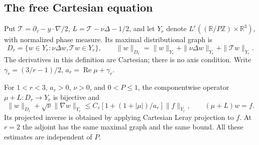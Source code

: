 \subsection{The free Cartesian equation}

Put \(\mathcal T=\partial_\tau-y\cdot\nabla/2\),
\(L=\mathcal T-\nu\Delta-1/2\), and let \(Y_r\) denote
\(L^r((\mathbb R/P\mathbb Z)\times\mathbb R^3)\), with normalized
phase measure. Its maximal distributional graph is
\[
 D_r=\{w\in Y_r:\nu\Delta w,\mathcal Tw\in Y_r\},\qquad
 \|w\|_{D_r}=\|w\|_{Y_r}+\|\nu\Delta w\|_{Y_r}
                                      +\|\mathcal Tw\|_{Y_r}.
\]
The derivatives in this definition are Cartesian; there is no axis
condition. Write \(\gamma_r=(3/r-1)/2\), \(a_r=\operatorname{Re}\mu+\gamma_r\).

\begin{lemma}\label{bg:common-body-graph}
For \(1<r<3\), \(a_r>0\), \(\nu>0\), and \(0<P\le1\),
the componentwise operator \(\mu+L:D_r\to Y_r\) is bijective and
\begin{equation}\label{bg:body-graph}
 \|w\|_{D_r}+\sqrt\nu\|\nabla w\|_{Y_r}
 \le C_r[1+(1+|\mu|)/a_r]\|f\|_{Y_r},
 \qquad (\mu+L)w=f.
\end{equation}
Its projected inverse is obtained by applying Cartesian Leray projection
to \(f\). At \(r=2\) the adjoint has the same maximal graph and the
same bound. All these estimates are independent of \(P\).
\end{lemma}

